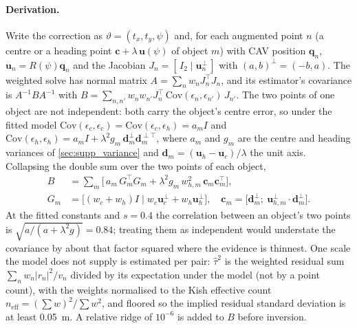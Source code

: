 \paragraph{Derivation.}
Write the correction as $\vartheta=(t_x,t_y,\psi)$ and, for each augmented point $n$ (a centre or a heading point $\mathbf{c}+\lambda\,\mathbf{u}(\psi)$ of object $m$) with CAV position $\mathbf{q}_n$, $\mathbf{u}_n=R(\psi)\mathbf{q}_n$ and the Jacobian $J_n=[\,I_2 \mid \mathbf{u}_n^{\perp}\,]$ with $(a,b)^{\perp}=(-b,a)$. The weighted solve has normal matrix $A=\sum_n w_n J_n^{\!\top}J_n$, and its estimator's covariance is $A^{-1}BA^{-1}$ with $B=\sum_{n,n'} w_n w_{n'} J_n^{\!\top}\,\mathrm{Cov}(\epsilon_n,\epsilon_{n'})\,J_{n'}$. The two points of one object are not independent: both carry the object's centre error, so under the fitted model $\mathrm{Cov}(\epsilon_c,\epsilon_c)=\mathrm{Cov}(\epsilon_c,\epsilon_h)=a_m I$ and $\mathrm{Cov}(\epsilon_h,\epsilon_h)=a_m I+\lambda^2 g_m\,\mathbf{d}_m^{\perp}\mathbf{d}_m^{\perp\top}$, where $a_m$ and $g_m$ are the centre and heading variances of \cref{sec:supp_variance} and $\mathbf{d}_m=(\mathbf{u}_h-\mathbf{u}_c)/\lambda$ the unit axis. Collapsing the double sum over the two points of each object,
\begin{align}
B&=\sum_m\Big[\,a_m\,G_m^{\!\top}G_m+\lambda^2 g_m\,w_{h,m}^2\,\mathbf{c}_m\mathbf{c}_m^{\!\top}\Big],\\
G_m&=\big[(w_c{+}w_h)I \mid w_c\mathbf{u}_c^{\perp}+w_h\mathbf{u}_h^{\perp}\big],\quad
\mathbf{c}_m=\big[\mathbf{d}_m^{\perp};\ \mathbf{u}_{h,m}^{\perp}\!\cdot\mathbf{d}_m^{\perp}\big].\nonumber
\end{align}
At the fitted constants and $s{=}0.4$ the correlation between an object's two points is $\sqrt{a/(a+\lambda^2 g)}=0.84$; treating them as independent would understate the covariance by about that factor squared where the evidence is thinnest. One scale the model does not supply is estimated per pair: $\hat\tau^2$ is the weighted residual sum $\sum_n w_n|r_n|^2/v_n$ divided by its expectation under the model (not by a point count), with the weights normalised to the Kish effective count $n_{\mathrm{eff}}=(\sum w)^2/\sum w^2$, and floored so the implied residual standard deviation is at least \SI{0.05}{m}. A relative ridge of $10^{-6}$ is added to $B$ before inversion.


